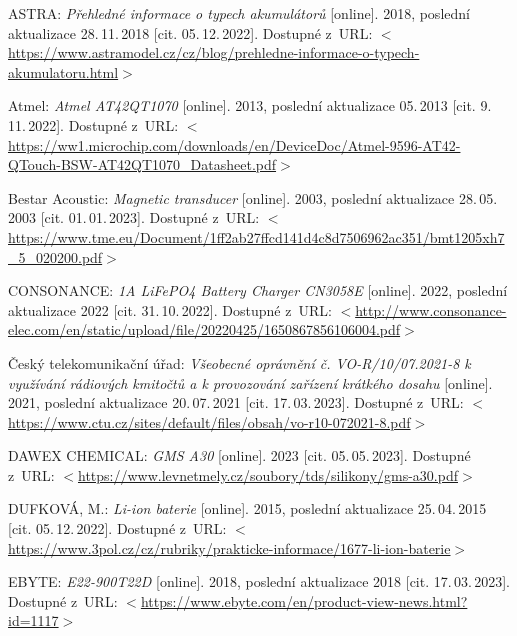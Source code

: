 \begin{thebibliography}{99}

    ASTRA:
    \emph{Přehledné informace o typech akumulátorů}\/ [online].
    2018, poslední aktualizace 28.\,11.\,2018 [cit. 05.\,12.\,2022].
    Dostupné z~URL:
    \(<\)\url{https://www.astramodel.cz/cz/blog/prehledne-informace-o-typech-akumulatoru.html}\(>\)

    Atmel:
    \emph{Atmel AT42QT1070}\/ [online].
    2013, poslední aktualizace 05.\,2013 [cit. 9.\,11.\,2022].
    Dostupné z~URL: 
    \(<\)\url{https://ww1.microchip.com/downloads/en/DeviceDoc/Atmel-9596-AT42-QTouch-BSW-AT42QT1070_Datasheet.pdf}\(>\)

    Bestar Acoustic:
    \emph{Magnetic transducer}\/ [online].
    2003, poslední aktualizace 28.\,05.\,2003 [cit. 01.\,01.\,2023]. 
    Dostupné z~URL:
    \(<\)\url{https://www.tme.eu/Document/1ff2ab27ffcd141d4c8d7506962ac351/bmt1205xh7_5_020200.pdf}\(>\)

    CONSONANCE:
    \emph{1A LiFePO4 Battery Charger CN3058E}\/ [online].
    2022, poslední aktualizace 2022 [cit. 31.\,10.\,2022].
    Dostupné z~URL: %
    \(<\)\url{http://www.consonance-elec.com/en/static/upload/file/20220425/1650867856106004.pdf}\(>\)

    Český telekomunikační úřad:
    \emph{Všeobecné oprávnění č. VO-R/10/07.2021-8 k využívání rádiových kmitočtů a k provozování zařízení krátkého dosahu}\/ [online].
    2021, poslední aktualizace 20.\,07.\,2021 [cit. 17.\,03.\,2023].
    Dostupné z~URL:
    \(<\)\url{https://www.ctu.cz/sites/default/files/obsah/vo-r10-072021-8.pdf}\(>\)

    DAWEX CHEMICAL:
    \emph{GMS A30}\/ [online].
    2023 [cit. 05.\,05.\,2023].
    Dostupné z~URL:
    \(<\)\url{https://www.levnetmely.cz/soubory/tds/silikony/gms-a30.pdf}\(>\)


    DUFKOVÁ, M.:
    \emph{Li-ion baterie}\/ [online].
    2015, poslední aktualizace 25.\,04.\,2015 [cit. 05.\,12.\,2022].
    Dostupné z~URL:
    \(<\)\url{https://www.3pol.cz/cz/rubriky/prakticke-informace/1677-li-ion-baterie}\(>\)

    EBYTE:
    \emph{E22-900T22D}\/ [online].
    2018, poslední aktualizace 2018 [cit. 17.\,03.\,2023].
    Dostupné z~URL:
    \(<\)\url{https://www.ebyte.com/en/product-view-news.html?id=1117}\(>\)


\end{thebibliography}
